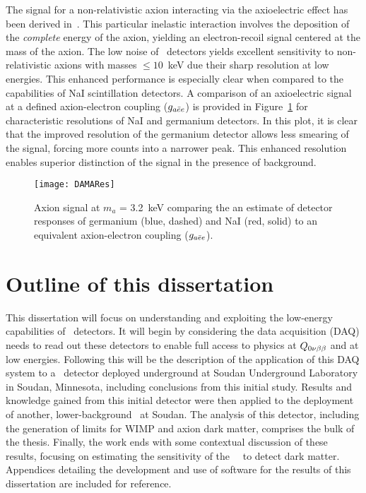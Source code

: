 	The signal for a non-relativistic axion interacting via the axioelectric effect has been derived in~\cite{Pospelov:2008jk}.  This particular inelastic interaction involves the deposition of the \emph{complete} energy of the axion, yielding an electron-recoil signal centered at the mass of the axion.  The low noise of \ppc~detectors yields excellent sensitivity to non-relativistic axions with masses $\leq10$~keV due their sharp resolution at low energies.  This enhanced performance is especially clear when compared to the capabilities of NaI scintillation detectors.  A comparison of an axioelectric signal at a defined axion-electron coupling ($g_{a\bar{e}e}$) is provided in Figure~\ref{fig:ResCompare} for characteristic resolutions of NaI and germanium detectors.  In this plot, it is clear that the improved resolution of the germanium detector allows less smearing of the signal, forcing more counts into a narrower peak.  This enhanced resolution enables superior distinction of the signal in the presence of background.
	
		\begin{figure}
			\centering
			\texttt{[image: DAMARes]}
			\caption[Axion signal at $m_{a}$ = 3.2~keV]{Axion signal at $m_{a}$ = 3.2~keV comparing 
			the an estimate of detector responses of germanium (blue, dashed) and NaI (red, solid) to an equivalent
			axion-electron coupling ($g_{a\bar{e}e}$).}
			\label{fig:ResCompare}
		\end{figure}
	
	\section{Outline of this dissertation}


	This dissertation will focus on understanding and exploiting the low-energy capabilities of \ppc~detectors.  It will begin by considering the data acquisition (DAQ) needs to read out these detectors to enable full access to physics at $Q_{0 \nu \beta \beta}$ and at low energies.  Following this will be the description of the application of this DAQ system to a \ppc~detector deployed underground at Soudan Underground Laboratory in Soudan, Minnesota, including conclusions from this initial study.  Results and knowledge gained from this initial detector were then applied to the deployment of another, lower-background \ppc~at Soudan.  The analysis of this detector, including the generation of limits for WIMP and axion dark matter, comprises the bulk of the thesis.  Finally, the work ends with some contextual discussion of these results, focusing on estimating the sensitivity of the \MJ~\minmod~to detect dark matter.  Appendices detailing the development and use of software for the results of this dissertation are included for reference.
